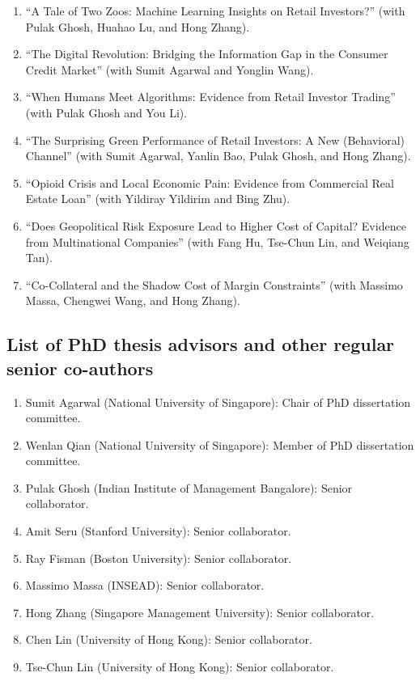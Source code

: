 \documentclass[11pt]{article}
\newcommand{\cvpub}[1]{\item #1}
\newcounter{pubdetailctr}
\newcommand{\pubdetail}[2]{\stepcounter{pubdetailctr}\item[\alph{pubdetailctr}.] \textit{#1}: #2}
\begin{document}
\begin{enumerate}[itemsep=0.8em]
\begin{itemize}[leftmargin=2.0em,label={},before=\setcounter{pubdetailctr}{0}]
	\pubdetail{Ranking}{NUS top-10 A-journal; FT-50}
\end{itemize}
\cvpub{``A Tale of Two Zoos: Machine Learning Insights on Retail Investors?'' (with Pulak Ghosh, Huahao Lu, and Hong Zhang).}
\cvpub{``The Digital Revolution: Bridging the Information Gap in the Consumer Credit Market'' (with Sumit Agarwal and Yonglin Wang).}
\cvpub{``When Humans Meet Algorithms: Evidence from Retail Investor Trading'' (with Pulak Ghosh and You Li).}
\cvpub{``The Surprising Green Performance of Retail Investors: A New (Behavioral) Channel'' (with Sumit Agarwal, Yanlin Bao, Pulak Ghosh, and Hong Zhang).}
\cvpub{``Opioid Crisis and Local Economic Pain: Evidence from Commercial Real Estate Loan'' (with Yildiray Yildirim and Bing Zhu).}
\cvpub{``Does Geopolitical Risk Exposure Lead to Higher Cost of Capital? Evidence from Multinational Companies'' (with Fang Hu, Tse-Chun Lin, and Weiqiang Tan).}
\cvpub{``Co-Collateral and the Shadow Cost of Margin Constraints'' (with Massimo Massa, Chengwei Wang, and Hong Zhang).}
\end{enumerate}

\subsection{List of PhD thesis advisors and other regular senior co-authors}
\begin{enumerate}[itemsep=0.35em]
\cvpub{Sumit Agarwal (National University of Singapore): Chair of PhD dissertation committee.}
\cvpub{Wenlan Qian (National University of Singapore): Member of PhD dissertation committee.}
\cvpub{Pulak Ghosh (Indian Institute of Management Bangalore): Senior collaborator.}
\cvpub{Amit Seru (Stanford University): Senior collaborator.}
\cvpub{Ray Fisman (Boston University): Senior collaborator.}
\cvpub{Massimo Massa (INSEAD): Senior collaborator.}
\cvpub{Hong Zhang (Singapore Management University): Senior collaborator.}
\cvpub{Chen Lin (University of Hong Kong): Senior collaborator.}
\cvpub{Tse-Chun Lin (University of Hong Kong): Senior collaborator.}
\end{enumerate}
\end{document}
